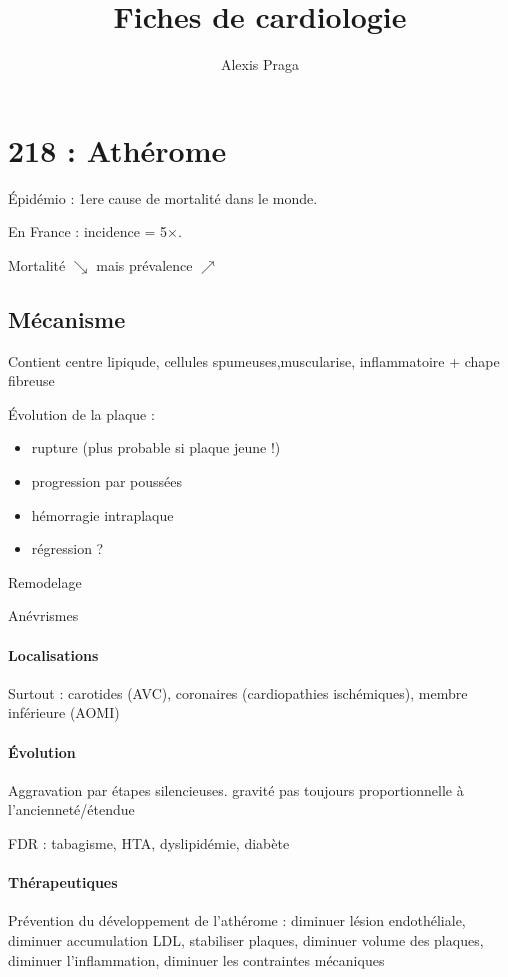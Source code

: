 
\def\arrow{$\rightarrow$}

\title{Fiches de cardiologie}
\author{Alexis Praga}
\maketitle
\tableofcontents



\section{218 : Athérome}%
\label{sec:1_atherome}

Épidémio : 1ere cause de mortalité dans le monde. 

En France : incidence \male = 5$\times$\female. 

Mortalité $\searrow$ mais prévalence $\nearrow$

\subsection{Mécanisme}
Contient centre lipiqude, cellules {spumeuses,muscularise, inflammatoire} +
chape fibreuse

Évolution de la plaque :
\begin{itemize}
  \item rupture (plus probable si plaque jeune !)
  \item progression par poussées
  \item hémorragie intraplaque
  \item régression ?
\end{itemize}
Remodelage

Anévrismes

\paragraph{Localisations}
Surtout : carotides (AVC), coronaires (cardiopathies ischémiques), membre inférieure
(AOMI)

\paragraph{Évolution} Aggravation par étapes silencieuses. \danger gravité pas
toujours proportionnelle à l'ancienneté/étendue

FDR : tabagisme, HTA, dyslipidémie, diabète

\paragraph{Thérapeutiques}
Prévention du développement de l'athérome : diminuer lésion endothéliale,
diminuer accumulation LDL, stabiliser plaques, diminuer volume des plaques,
diminuer l'inflammation, diminuer les contraintes mécaniques

